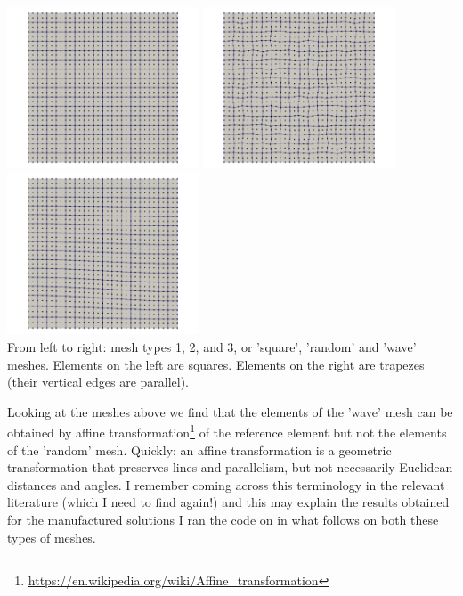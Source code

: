 \begin{center}
\includegraphics[width=5.7cm]{python_codes/fieldstone_76/results/mesh_type1}
\includegraphics[width=5.7cm]{python_codes/fieldstone_76/results/mesh_type2}
\includegraphics[width=5.7cm]{python_codes/fieldstone_76/results/mesh_type3}\\
{\captionfont From left to right: mesh types 1, 2, and 3, or 'square', 'random' 
and 'wave' meshes. Elements on the left are squares. Elements on the right are trapezes (their
vertical edges are parallel).}
\end{center}

Looking at the meshes above we find that the elements of the 'wave' mesh 
can be obtained by affine transformation\footnote{\url{https://en.wikipedia.org/wiki/Affine_transformation}} 
of the reference element but not the elements of the 'random' mesh. 
Quickly: an affine transformation 
is a geometric transformation that preserves lines and parallelism, but not necessarily 
Euclidean distances and angles. 
I remember coming across this terminology in the relevant literature (which I need to find again!)
and this may explain the results obtained for the manufactured solutions I ran the code on 
in what follows on both these types of meshes.

